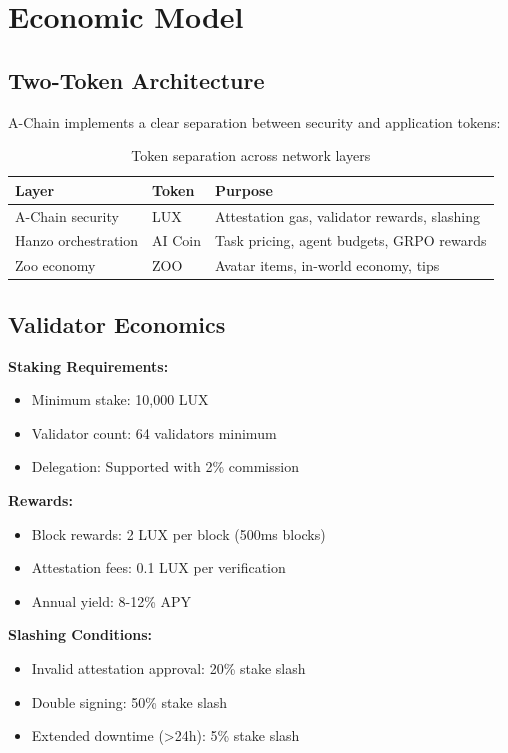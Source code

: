 \section{Economic Model}


\subsection{Two-Token Architecture}

A-Chain implements a clear separation between security and application tokens:

\begin{table}[h]
\centering
\begin{tabular}{@{}lll@{}}
\toprule
\textbf{Layer} & \textbf{Token} & \textbf{Purpose} \\ \midrule
A-Chain security & LUX & Attestation gas, validator rewards, slashing \\
Hanzo orchestration & AI Coin & Task pricing, agent budgets, GRPO rewards \\
Zoo economy & ZOO & Avatar items, in-world economy, tips \\ \bottomrule
\end{tabular}
\caption{Token separation across network layers}
\end{table}

\subsection{Validator Economics}

\textbf{Staking Requirements:}
\begin{itemize}
\item Minimum stake: 10,000 LUX
\item Validator count: 64 validators minimum
\item Delegation: Supported with 2\% commission
\end{itemize}

\textbf{Rewards:}
\begin{itemize}
\item Block rewards: 2 LUX per block (500ms blocks)
\item Attestation fees: 0.1 LUX per verification
\item Annual yield: 8-12\% APY
\end{itemize}

\textbf{Slashing Conditions:}
\begin{itemize}
\item Invalid attestation approval: 20\% stake slash
\item Double signing: 50\% stake slash
\item Extended downtime (>24h): 5\% stake slash
\end{itemize}

